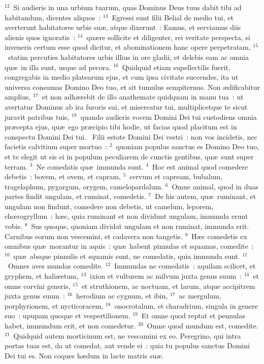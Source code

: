 ${}^{12}$~Si audieris in una urbium tuarum, quas Dominus Deus tuus dabit tibi ad habitandum, dicentes aliquos~:
${}^{13}$~Egressi sunt filii Belial de medio tui, et averterunt habitatores urbis su\ae , atque dixerunt~: Eamus, et serviamus diis alienis quos ignoratis~:
${}^{14}$~qu\ae re sollicite et diligenter, rei veritate perspecta, si inveneris certum esse quod dicitur, et abominationem hanc opere perpetratam,
${}^{15}$~statim percuties habitatores urbis illius in ore gladii, et delebis eam ac omnia qu\ae\ in illa sunt, usque ad pecora.
${}^{16}$~Quidquid etiam supellectilis fuerit, congregabis in medio platearum ejus, et cum ipsa civitate succendes, ita ut universa consumas Domino Deo tuo, et sit tumulus sempiternus. Non \ae dificabitur amplius,
${}^{17}$~et non adh\ae rebit de illo anathemate quidquam in manu tua~: ut avertatur Dominus ab ira furoris sui, et misereatur tui, multiplicetque te sicut juravit patribus tuis,
${}^{18}$~quando audieris vocem Domini Dei tui custodiens omnia pr\ae cepta ejus, qu\ae\ ego pr\ae cipio tibi hodie, ut facias quod placitum est in conspectu Domini Dei tui.
~\lettrine[lines=10,image=true,loversize=0.05,lraise=-0.03]{F}{}ilii estote Domini Dei vestri~: non vos incidetis, nec facietis calvitium super mortuo~:
${}^{2}$~quoniam populus sanctus es Domino Deo tuo, et te elegit ut sis ei in populum peculiarem de cunctis gentibus, qu\ae\ sunt super terram.
${}^{3}$~Ne comedatis qu\ae\ immunda sunt.
${}^{4}$~Hoc est animal quod comedere debetis~: bovem, et ovem, et capram,
${}^{5}$~cervum et capream, bubalum, tragelaphum, pygargum, orygem, camelopardalum.
${}^{6}$~Omne animal, quod in duas partes findit ungulam, et ruminat, comedetis.
${}^{7}$~De his autem, qu\ae\ ruminant, et ungulam non findunt, comedere non debetis, ut camelum, leporem, chœrogryllum~: h\ae c, quia ruminant et non dividunt ungulam, immunda erunt vobis.
${}^{8}$~Sus quoque, quoniam dividat ungulam et non ruminat, immunda erit. Carnibus eorum non vescemini, et cadavera non tangetis.
${}^{9}$~H\ae c comedetis ex omnibus qu\ae\ morantur in aquis~: qu\ae\ habent pinnulas et squamas, comedite~:
${}^{10}$~qu\ae\ absque pinnulis et squamis sunt, ne comedatis, quia immunda sunt.
${}^{11}$~Omnes aves mundas comedite.
${}^{12}$~Immundas ne comedatis~: aquilam scilicet, et gryphem, et hali\ae etum,
${}^{13}$~ixion et vulturem ac milvum juxta genus suum~:
${}^{14}$~et omne corvini generis,
${}^{15}$~et struthionem, ac noctuam, et larum, atque accipitrem juxta genus suum~:
${}^{16}$~herodium ac cygnum, et ibin,
${}^{17}$~ac mergulum, porphyrionem, et nycticoracem,
${}^{18}$~onocrotalum, et charadrium, singula in genere suo~: upupam quoque et vespertilionem.
${}^{19}$~Et omne quod reptat et pennulas habet, immundum erit, et non comedetur.
${}^{20}$~Omne quod mundum est, comedite.
${}^{21}$~Quidquid autem morticinum est, ne vescamini ex eo. Peregrino, qui intra portas tuas est, da ut comedat, aut vende ei~: quia tu populus sanctus Domini Dei tui es. Non coques h\ae dum in lacte matris su\ae .


